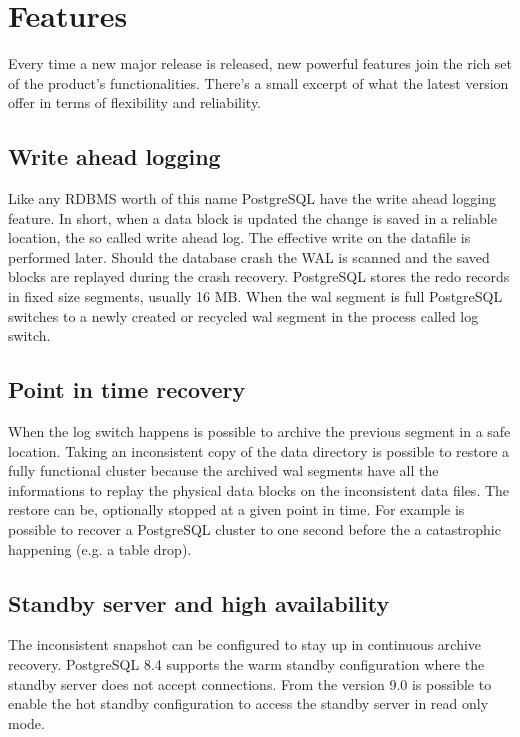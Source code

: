 \section{Features}
Every time a new major release is released, new powerful features join the
rich set of the product's functionalities.
There's a small excerpt of what the latest version offer in terms of flexibility
and reliability.

\subsection{Write ahead logging}
Like any RDBMS worth of this name PostgreSQL have the write ahead logging
feature.
In short, when a data block is updated the change is saved in a reliable
location, the so called write ahead log. The
effective write on the datafile is performed later. Should the database crash
the WAL is scanned and the saved blocks are replayed during the
crash recovery. PostgreSQL stores the redo records in fixed size segments,
usually 16 MB. When the wal segment is full PostgreSQL switches to a newly
created or recycled wal segment in the process called log switch. 

\subsection{Point in time recovery}
When the
log switch happens is possible to archive the previous segment in a safe
location. Taking an inconsistent copy of the data directory is possible to
restore a fully functional cluster because the
archived wal segments have all the informations to replay the physical data
blocks on the inconsistent data files. The restore can be, optionally stopped
at a given point in time. For example is possible to recover a PostgreSQL
cluster to one second before the a catastrophic happening (e.g. a table
drop). 

\subsection{Standby server and high availability}
The inconsistent snapshot
can be configured to stay up in continuous archive recovery. PostgreSQL 8.4
supports the warm standby configuration where the standby
server does not accept connections. From the version 9.0 is possible to
enable the hot standby configuration to access the standby
server in read only mode.

